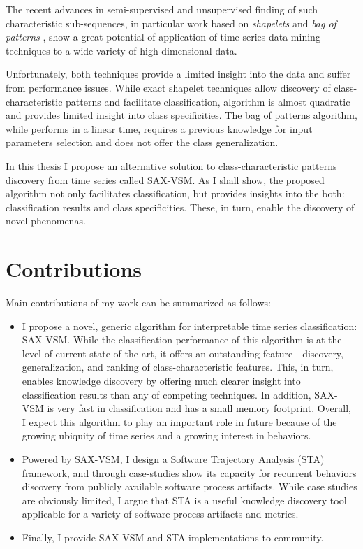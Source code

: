 The recent advances in semi-supervised and unsupervised finding of such characteristic sub-sequences, 
in particular work based on \textit{shapelets} \cite{citeulike:7344347} \cite{citeulike:11957982}
\cite{citeulike:12552293} and \textit{bag of patterns} \cite{citeulike:10525778}, show a great potential 
of application of time series data-mining techniques to a wide variety of high-dimensional data.

Unfortunately, both techniques provide a limited insight into the data and suffer from performance issues. 
While exact shapelet techniques allow discovery of class-characteristic patterns and facilitate classification,
algorithm is almost quadratic and provides limited insight into class specificities. 
The bag of patterns algorithm, while performs in a linear time, requires a previous knowledge for input parameters 
selection and does not offer the class generalization.

In this thesis I propose an alternative solution to class-characteristic patterns discovery from time series called 
SAX-VSM. As I shall show, the proposed algorithm not only facilitates classification, but provides insights into 
the both: classification results and class specificities. These, in turn, enable the discovery of novel phenomenas.

\section{Contributions}\label{section_contributions}
Main contributions of my work can be summarized as follows: 
\begin{itemize}
\item I propose a novel, generic algorithm for interpretable time series classification: SAX-VSM. 
While the classification performance of this algorithm is at the level of current state of the art, 
it offers an outstanding feature - discovery, generalization, and ranking of class-characteristic features. 
This, in turn, enables knowledge discovery by offering much clearer insight into classification results than any of 
competing techniques.
In addition, SAX-VSM is very fast in classification and has a small memory footprint. 
Overall, I expect this algorithm to play an important role in future because of the growing ubiquity of time series and 
a growing interest in behaviors.
\item Powered by SAX-VSM, I design a Software Trajectory Analysis (STA) framework, and through case-studies 
show its capacity for recurrent behaviors discovery from publicly available software process
artifacts. While case studies are obviously limited, I argue that STA is a useful knowledge discovery tool applicable for a 
variety of software process artifacts and metrics. 
\item Finally, I provide SAX-VSM and STA implementations to community.
\end{itemize}

